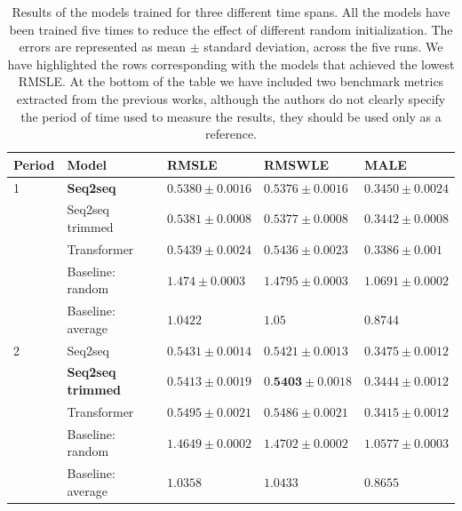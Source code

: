 \begin{table}[h]
\scriptsize
\caption{Results of the models trained for three different time spans. All the models have been trained five times to reduce the effect of different random initialization. The errors are represented as mean $\pm$ standard deviation, across the five runs. We have highlighted the rows corresponding with the models that achieved the lowest RMSLE. At the bottom of the table we have included two benchmark metrics extracted from the previous works, although the authors do not clearly specify the period of time used to measure the results, they should be used only as a reference.}
	\label{tab:salesforecast_results}
	\centering
	\begin{tabular}{lllll}
		\hline
		Period    & Model                     & RMSLE                          & RMSWLE                         & MALE                           \\ \hline
		1         & \textbf{Seq2seq}          & $ \mathbf{0.5380 \pm 0.0016} $ & $ \mathbf{0.5376 \pm 0.0016 }$ & $  \mathbf{0.3450 \pm 0.0024}$ \\
         & Seq2seq trimmed           & $ 0.5381 \pm 0.0008 $          & $ 0.5377 \pm 0.0008 $          & $ 0.3442 \pm 0.0008 $          \\
         & Transformer               & $ 0.5439 \pm 0.0024 $          & $ 0.5436 \pm 0.0023 $          & $ 0.3386 \pm 0.001 $           \\
         & Baseline: random          & $ 1.474 \pm 0.0003 $           & $ 1.4795 \pm 0.0003 $          & $ 1.0691 \pm 0.0002 $          \\
         & Baseline: average         & $ 1.0422$                      & $ 1.05$                        & $ 0.8744$                      \\ \hline
		2         & Seq2seq                   & $ 0.5431 \pm 0.0014 $          & $ 0.5421 \pm 0.0013 $          & $ 0.3475 \pm 0.0012 $          \\
         & \textbf{Seq2seq trimmed } & $ \mathbf{0.5413 \pm 0.0019} $ & $ 0.\mathbf{5403 \pm 0.0018 }$ & $ \mathbf{0.3444 \pm 0.0012} $ \\
         & Transformer               & $ 0.5495 \pm 0.0021 $          & $ 0.5486 \pm 0.0021 $          & $ 0.3415 \pm 0.0012 $          \\
         & Baseline: random          & $ 1.4649 \pm 0.0002 $          & $ 1.4702 \pm 0.0002 $          & $ 1.0577 \pm 0.0003 $          \\
         & Baseline: average         & $ 1.0358$                      & $ 1.0433$                      & $ 0.8655$                      \\ \hline

\end{tabular}
\end{table}
